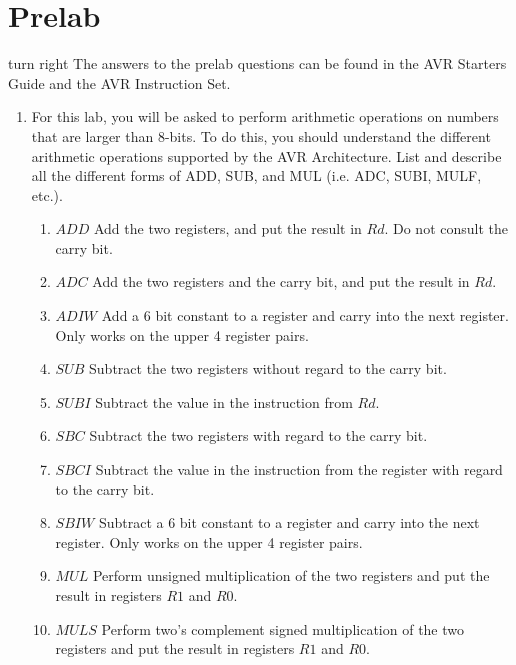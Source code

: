 \documentclass[12pt,letterpaper]{article}
\begin{document}
\section{Prelab}
    turn right
The answers to the prelab questions can be found in the AVR Starters Guide and
the AVR Instruction Set.
\begin{enumerate}
    \item For this lab, you will be asked to perform arithmetic operations on numbers that
are larger than 8-bits. To do this, you should understand the different arithmetic operations supported by the AVR Architecture. List and describe all the different forms of ADD, SUB, and MUL (i.e. ADC, SUBI, MULF, etc.).\\
\begin{enumerate}
    \item $ADD$  Add the two registers, and put the result in $Rd$. Do not consult the carry bit.\\
    \item $ADC$  Add the two registers and the carry bit, and put the result in $Rd$.\\
    \item $ADIW$ Add a 6 bit constant to a register and carry into the next register. Only works on the upper 4 register pairs.\\
    \item $SUB$ Subtract the two registers without regard to the carry bit.\\
    \item $SUBI$ Subtract the value in the instruction from $Rd$.\\
    \item $SBC$ Subtract the two registers with regard to the carry bit.\\
    \item $SBCI$ Subtract the value in the instruction from the register with regard to the carry bit.\\
    \item $SBIW$ Subtract a 6 bit constant to a register and carry into the next register. Only works on the upper 4 register pairs.\\
    \item $MUL$ Perform unsigned multiplication of the two registers and put the result in registers $R1$ and $R0$.\\
    \item $MULS$ Perform two's complement signed multiplication of the two registers and put the result in registers $R1$ and $R0$.\\

\end{enumerate}
\end{enumerate}
\end{document}
